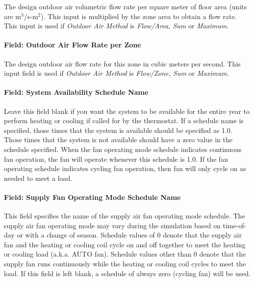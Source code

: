 The design outdoor air volumetric flow rate per square meter of floor area (units are m\(^{3}\)/s-m\(^{2}\)). This input is multiplied by the zone area to obtain a flow rate. This input is used if \emph{Outdoor Air Method} is \emph{Flow/Area, Sum} or \emph{Maximum}.

\paragraph{Field: Outdoor Air Flow Rate per Zone}\label{field-outdoor-air-flow-rate-per-zone-5}

The design outdoor air flow rate for this zone in cubic meters per second. This input field is used if \emph{Outdoor Air Method} is \emph{Flow/Zone, Sum} or \emph{Maximum}.

\paragraph{Field: System Availability Schedule Name}\label{field-system-availability-schedule-name-4}

Leave this field blank if you want the system to be available for the entire year to perform heating or cooling if called for by the thermostat. If a schedule name is specified, those times that the system is available should be specified as 1.0. Those times that the system is not available should have a zero value in the schedule specified. When the fan operating mode schedule indicates continuous fan operation, the fan will operate whenever this schedule is 1.0. If the fan operating schedule indicates cycling fan operation, then fan will only cycle on as needed to meet a load.

\paragraph{Field: Supply Fan Operating Mode Schedule Name}\label{field-supply-fan-operating-mode-schedule-name-2}

This field specifies the name of the supply air fan operating mode schedule. The supply air fan operating mode may vary during the simulation based on time-of-day or with a change of season. Schedule values of 0 denote that the supply air fan and the heating or cooling coil cycle on and off together to meet the heating or cooling load (a.k.a. AUTO fan). Schedule values other than 0 denote that the supply fan runs continuously while the heating or cooling coil cycles to meet the load. If this field is left blank, a schedule of always zero (cycling fan) will be used.

